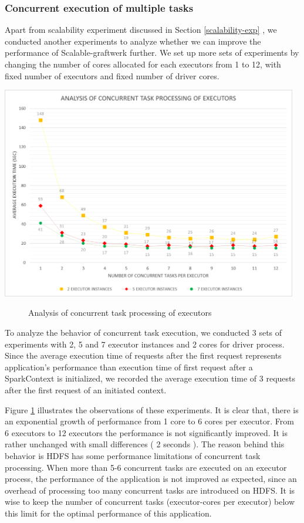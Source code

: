 \subsubsection{\textbf{Concurrent execution of multiple tasks}}
Apart from scalability experiment discussed in Section \ref{scalability-exp} , we conducted another experiments to analyze whether we can  improve the performance of Scalable-graftwerk further. We set up more sets of experiments by changing the number of cores allocated for each executors from 1 to 12, with fixed number of executors and fixed number of driver cores. 
\begin{center}
	\includegraphics[width=35em]{./Figures/executor-cores2}
	\begin{figure}[htbp]
    \caption{Analysis of concurrent task processing of executors}
    \label{fig:executor-cores}
	\end{figure}
\end{center}
To analyze the behavior of concurrent task execution, we conducted 3 sets of experiments with 2, 5  and 7 executor instances and 2 cores for driver process. Since the average execution time of requests after the first request represents application's performance than execution time of first request after a SparkContext is initialized, we recorded the average execution time of 3 requests after the first request of an initiated context. 

Figure \ref{fig:executor-cores} illustrates the observations of these experiments.  It is clear that, there is an exponential growth of performance from 1 core to 6 cores per executor. From 6 executors to 12 executors the performance is not significantly improved. It is rather unchanged with small differences ( 2 seconds ). The reason behind this behavior is HDFS has some performance limitations of concurrent task processing. When more than 5-6 concurrent tasks are executed on an executor process, the performance of the application is not improved as expected, since an overhead of processing too many concurrent tasks are introduced on HDFS. It is wise to keep the number of concurrent tasks (executor-cores per executor) below this limit for the optimal performance of this application.  

